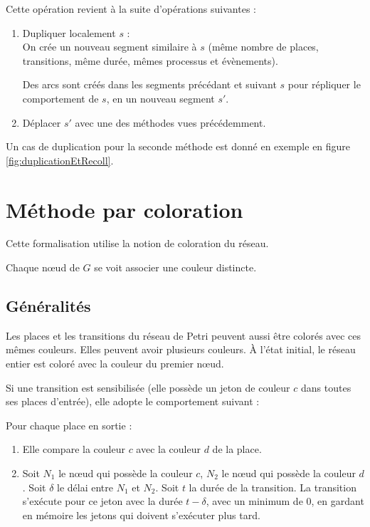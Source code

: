 Cette opération revient à la suite d'opérations suivantes : 
\begin{enumerate}
\item Dupliquer localement $s$ : \\
		On crée un nouveau segment similaire à $s$ (même nombre de places, transitions, même durée, mêmes processus et évènements).
		
		Des arcs sont créés dans les segments précédant et suivant $s$ pour répliquer le comportement de $s$, en un nouveau segment $s'$.
\item Déplacer $s'$ avec une des méthodes vues précédemment.
\end{enumerate}

Un cas de duplication pour la seconde méthode est donné en exemple en figure \ref{fig:duplicationEtRecoll}.

\section{Méthode par coloration}
Cette formalisation utilise la notion de coloration du réseau.

Chaque nœud de $G$ se voit associer une couleur distincte.

\subsection{Généralités}
Les places et les transitions du réseau de Petri peuvent aussi être colorés avec ces mêmes couleurs. Elles peuvent avoir plusieurs couleurs.
À l'état initial, le réseau entier est coloré avec la couleur du premier nœud.

Si une transition est sensibilisée (elle possède un jeton de couleur $c$ dans toutes ses places d'entrée), elle adopte le comportement suivant : 

Pour chaque place en sortie :
\begin{enumerate}
\item Elle compare la couleur $c$ avec la couleur $d$ de la place. 
\item Soit $N_1$ le nœud qui possède la couleur $c$, $N_2$ le nœud qui possède la couleur $d$. Soit $\delta$ le délai entre $N_1$ et $N_2$. Soit $t$ la durée de la transition. La transition s'exécute pour ce jeton avec la durée $t - \delta$, avec un minimum de 0, en gardant en mémoire les jetons qui doivent s'exécuter plus tard.
\end{enumerate}


